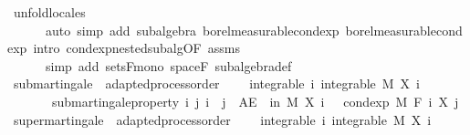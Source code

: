 \begin{isabellebody}
\ {\isacharparenleft}{\kern0pt}unfold{\isacharunderscore}{\kern0pt}locales{\isacharcomma}{\kern0pt}\isanewline
\ \ \ \ \ \ auto\ simp\ add{\isacharcolon}{\kern0pt}\ subalgebra\ borel{\isacharunderscore}{\kern0pt}measurable{\isacharunderscore}{\kern0pt}cond{\isacharunderscore}{\kern0pt}exp\ borel{\isacharunderscore}{\kern0pt}measurable{\isacharunderscore}{\kern0pt}cond{\isacharunderscore}{\kern0pt}exp{\isacharprime}{\kern0pt}\ intro{\isacharbang}{\kern0pt}{\isacharcolon}{\kern0pt}\ cond{\isacharunderscore}{\kern0pt}exp{\isacharunderscore}{\kern0pt}nested{\isacharunderscore}{\kern0pt}subalg{\isacharbrackleft}{\kern0pt}OF\ assms{\isacharbrackright}{\kern0pt}{\isacharcomma}{\kern0pt}\isanewline
\ \ \ \ \ \ simp\ add{\isacharcolon}{\kern0pt}\ sets{\isacharunderscore}{\kern0pt}F{\isacharunderscore}{\kern0pt}mono\ space{\isacharunderscore}{\kern0pt}F\ subalgebra{\isacharunderscore}{\kern0pt}def{\isacharparenright}{\kern0pt}%
\endisatagproof
{\isafoldproof}%
%
\isadelimproof
%
\endisadelimproof
%
\isadelimdocument
%
\endisadelimdocument
%
\isatagdocument
%
\isamarkuptrue%
%
\endisatagdocument
{\isafolddocument}%
%
\isadelimdocument
%
\endisadelimdocument
{}\isamarkupfalse%
\ submartingale\ {\isacharequal}{\kern0pt}\ adapted{\isacharunderscore}{\kern0pt}process{\isacharunderscore}{\kern0pt}order\ {\isacharplus}{\kern0pt}\isanewline
\ \ \ integrable{\isacharcolon}{\kern0pt}\ {\isachardoublequoteopen}{\isasymAnd}i{\isachardot}{\kern0pt}\ integrable\ M\ {\isacharparenleft}{\kern0pt}X\ i{\isacharparenright}{\kern0pt}{\isachardoublequoteclose}\isanewline
\ \ \ \ \ \ \ submartingale{\isacharunderscore}{\kern0pt}property{\isacharcolon}{\kern0pt}\ {\isachardoublequoteopen}{\isasymAnd}i\ j{\isachardot}{\kern0pt}\ i\ {\isasymle}\ j\ {\isasymLongrightarrow}\ AE\ {\isasymxi}\ in\ M{\isachardot}{\kern0pt}\ X\ i\ {\isasymxi}\ {\isasymle}\ cond{\isacharunderscore}{\kern0pt}exp\ M\ {\isacharparenleft}{\kern0pt}F\ i{\isacharparenright}{\kern0pt}\ {\isacharparenleft}{\kern0pt}X\ j{\isacharparenright}{\kern0pt}\ {\isasymxi}{\isachardoublequoteclose}%
\isadelimdocument
%
\endisadelimdocument
%
\isatagdocument
%
\isamarkuptrue%
%
\endisatagdocument
{\isafolddocument}%
%
\isadelimdocument
%
\endisadelimdocument
{}\isamarkupfalse%
\ supermartingale\ {\isacharequal}{\kern0pt}\ adapted{\isacharunderscore}{\kern0pt}process{\isacharunderscore}{\kern0pt}order\ {\isacharplus}{\kern0pt}\isanewline
\ \ \ integrable{\isacharcolon}{\kern0pt}\ {\isachardoublequoteopen}{\isasymAnd}i{\isachardot}{\kern0pt}\ integrable\ M\ {\isacharparenleft}{\kern0pt}X\ i{\isacharparenright}{\kern0pt}{\isachardoublequoteclose}\isanewline

\end{isabellebody}
